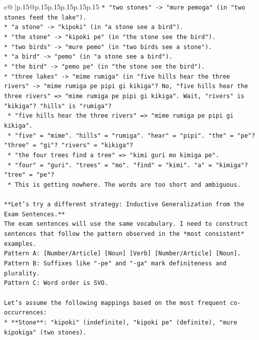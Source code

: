 \documentclass{article}
\begin{document}
{\begin{supertabular}{c@{$\;$}|p{.15\linewidth}@{}p{.15\linewidth}p{.15\linewidth}p{.15\linewidth}p{.15\linewidth}p{.15\linewidth}}
{{{\texttt{*   "two stones" {-}> "mure pemoga" (in "two stones feed the lake").} \\
\texttt{*   "a stone" {-}> "kipoki" (in "a stone see a bird").} \\
\texttt{*   "the stone" {-}> "kipoki pe" (in "the stone see the bird").} \\
\texttt{*   "two birds" {-}> "mure pemo" (in "two birds see a stone").} \\
\texttt{*   "a bird" {-}> "pemo" (in "a stone see a bird").} \\
\texttt{*   "the bird" {-}> "pemo pe" (in "the stone see the bird").} \\
\texttt{*   "three lakes" {-}> "mime rumiga" (in "five hills hear the three rivers" {-}> "mime rumiga pe pipi gi kikiga"? No, "five hills hear the three rivers" => "mime rumiga pe pipi gi kikiga". Wait, "rivers" is "kikiga"? "hills" is "rumiga"?} \\
\texttt{    *   "five hills hear the three rivers" => "mime rumiga pe pipi gi kikiga".} \\
\texttt{    *   "five" = "mime". "hills" = "rumiga". "hear" = "pipi". "the" = "pe"? "three" = "gi"? "rivers" = "kikiga"?} \\
\texttt{    *   "the four trees find a tree" => "kimi guri mo kimiga pe".} \\
\texttt{        *   "four" = "guri". "trees" = "mo". "find" = "kimi". "a" = "kimiga"? "tree" = "pe"?} \\
\texttt{        *   This is getting nowhere. The words are too short and ambiguous.} \\
\\ 
\texttt{**Let's try a different strategy: Inductive Generalization from the Exam Sentences.**} \\
\texttt{The exam sentences will use the same vocabulary. I need to construct sentences that follow the pattern observed in the *most consistent* examples.} \\
\texttt{Pattern A: {[}Number/Article{]} {[}Noun{]} {[}Verb{]} {[}Number/Article{]} {[}Noun{]}.} \\
\texttt{Pattern B: Suffixes like "{-}pe" and "{-}ga" mark definiteness and plurality.} \\
\texttt{Pattern C: Word order is SVO.} \\
\\ 
\texttt{Let's assume the following mappings based on the most frequent co{-}occurrences:} \\
\texttt{*   **Stone**: "kipoki" (indefinite), "kipoki pe" (definite), "mure kipokiga" (two stones).} \\
}}}
\end{supertabular}}
\end{document}
